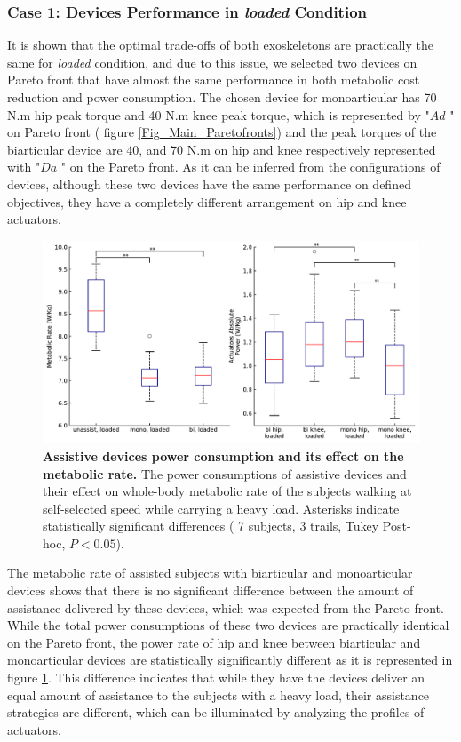 \documentclass[10pt,letterpaper]{article}
\begin{document}
\subsubsection*{Case 1: Devices Performance in \textit{\textit{loaded}} Condition}
It is shown that the optimal trade-offs of both exoskeletons are practically the same for {\it loaded} condition, and due to this issue, we selected two devices on Pareto front that have almost the same performance in both metabolic cost reduction and power consumption. The chosen device for monoarticular has 70 N.m hip peak torque and 40 N.m knee peak torque, which is represented by "$Ad$ " on Pareto front ( figure \ref{Fig_Main_Paretofronts}) and the peak torques of the biarticular device are 40, and 70 N.m on hip and knee respectively represented with "$Da$ " on the Pareto front. As it can be inferred from the configurations of devices, although these two devices have the same performance on defined objectives, they have a completely different arrangement on hip and knee actuators.
\begin{figure}[ht]   
	\centering
	\includegraphics[width=\linewidth]{Case_Studies/LoadedMono04_LoadedBi16/PaperFigure_BoxPlot.pdf}
	\vspace{1mm}
	\caption{\small{\textbf{Assistive devices power consumption and its effect on the metabolic rate.} The power consumptions of assistive devices and their effect on whole-body metabolic rate of the subjects walking at self-selected speed while carrying a heavy load. Asterisks indicate statistically significant differences ( 7 subjects, 3 trails, Tukey Post-hoc, $P < 0.05$).}}
	\label{Fig_Case01_Energy_Plot}
\end{figure}
The metabolic rate of assisted subjects with biarticular and monoarticular devices shows that there is no significant difference between the amount of assistance delivered by these devices, which was expected from the Pareto front. While the total power consumptions of these two devices are practically identical on the Pareto front, the power rate of hip and knee between biarticular and monoarticular devices are statistically significantly different as it is represented in figure \ref{Fig_Case01_Energy_Plot}. This difference indicates that while they have the devices deliver an equal amount of assistance to the subjects with a heavy load, their assistance strategies are different, which can be illuminated by analyzing the profiles of actuators.\\
\end{document}
